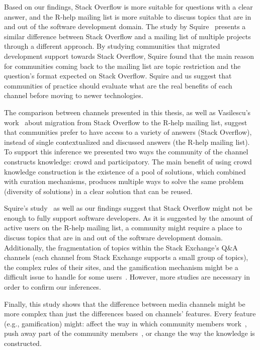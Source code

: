 \documentclass{sig-alternate-05-2015}
\begin{document}
	Based on our findings, Stack Overflow is more suitable for questions with a clear answer, and the R-help mailing list is more suitable to discuss topics that are in and out of the software development domain.
	The study by Squire~\cite{Squire2015a} presents a similar difference between Stack Overflow and a mailing list of multiple projects through a different approach. 
	By studying communities that migrated development support towards Stack Overflow, Squire found that the main reason for communities coming back to the mailing list are topic restriction and the question's format expected on Stack Overflow.
	Squire and us suggest that communities of practice should evaluate what are the real benefits of each channel before moving to newer technologies.

	The comparison between channels presented in this thesis, as well as Vasilescu's work~\cite{Vasilescu2014c} about migration from Stack Overflow to the R-help mailing list, suggest that communities prefer to have access to a variety of answers (Stack Overflow), instead of single contextualized and discussed answers (the R-help mailing list). 
	To support this inference we presented two ways the community of the channel constructs knowledge: crowd and participatory. 
	The main benefit of using crowd knowledge construction is the existence of a pool of solutions, which combined with curation mechanisms, produces multiple ways to solve the same problem (diversity of solutions) in a clear solution that can be reused.

	Squire's study~\cite{Squire2015a} as well as our findings suggest that Stack Overflow might not be enough to fully support software developers.
	As it is suggested by the amount of active users on the R-help mailing list, a community might require a place to discuss topics that are in and out of the software development domain.
	Additionally, the fragmentation of topics within the Stack Exchange's Q\&A channels (each channel from Stack Exchange supports a small group of topics), the complex rules of their sites, and the gamification mechanism might be a difficult issue to handle for some users~\cite{Vasilescu2013}.
	However, more studies are necessary in order to confirm our inferences. 

	Finally, this study shows that the difference between media channels might be more complex than just the differences based on channels' features. 
	Every feature (e.g., gamification) might: affect the way in which community members work~\cite{Antin2011,Singer2013}, push away part of the community members~\cite{Vasilescu2013}, or change the way the knowledge is constructed.
\end{document}
